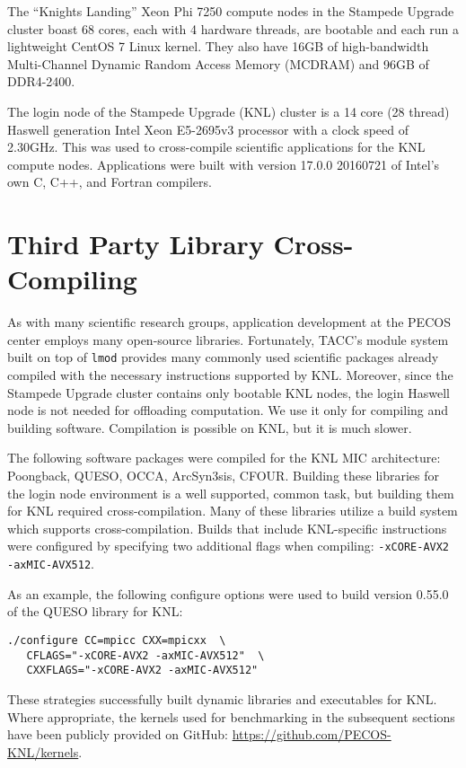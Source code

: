The ``Knights Landing'' Xeon Phi 7250 compute nodes in the Stampede Upgrade
cluster boast 68 cores, each with 4 hardware threads, are bootable and each run
a lightweight CentOS 7 Linux kernel.  They also have 16GB of high-bandwidth
Multi-Channel Dynamic Random Access Memory (MCDRAM) and 96GB of DDR4-2400.

The login node of the Stampede Upgrade (KNL) cluster is a 14 core (28 thread)
Haswell generation Intel Xeon E5-2695v3 processor with a clock speed of
2.30GHz.  This was used to cross-compile scientific applications for the KNL
compute nodes.  Applications were built with version 17.0.0 20160721 of Intel's
own C, C++, and Fortran compilers.

\section{Third Party Library Cross-Compiling}
\label{sec:cross_compile}

As with many scientific research groups, application development at the PECOS
center employs many open-source libraries.  Fortunately, TACC's module system
built on top of \texttt{lmod} provides many commonly used scientific packages
already compiled with the necessary instructions supported by KNL.  Moreover,
since the Stampede Upgrade cluster contains only bootable KNL nodes, the login
Haswell node is not needed for offloading computation.  We use it only for
compiling and building software.  Compilation is possible on KNL, but it is
much slower.

The following software packages were compiled for the KNL MIC architecture:
Poongback, QUESO, OCCA, ArcSyn3sis, CFOUR.  Building these libraries
for the login node environment is a well supported, common task, but building
them for KNL required cross-compilation.  Many of these libraries utilize a
build system which supports cross-compilation.  Builds that include
KNL-specific instructions were configured by specifying two additional flags
when compiling: \texttt{-xCORE-AVX2 -axMIC-AVX512}.

As an example, the following configure options were used to build version
0.55.0 of the QUESO library for KNL:

{\small
\begin{verbatim}
./configure CC=mpicc CXX=mpicxx  \
   CFLAGS="-xCORE-AVX2 -axMIC-AVX512"  \
   CXXFLAGS="-xCORE-AVX2 -axMIC-AVX512"
\end{verbatim}
}

These strategies successfully built dynamic libraries and executables for KNL.
Where appropriate, the kernels used for benchmarking in the subsequent sections have been 
publicly provided on GitHub: \url{https://github.com/PECOS-KNL/kernels}. 
